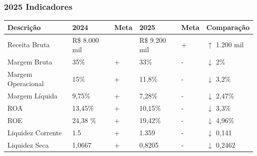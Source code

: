 \subsubsection{2025 Indicadores}
\hspace*{-1cm}                                                                 
 \begin{tabular}{p{3cm} l l l l l}                                                     
 \toprule                                                                       
 \textbf{Descrição} & \textbf{2024} & \textbf{Meta} & \textbf{2025} &  \textbf{Meta} & \textbf{Comparação}  \\                \midrule                                                                       
 Receita Bruta & R\$ 8.000 mil &  &  R\$ 9.200 mil & +  & $\uparrow$ 1.200 mil \\                                        
 \midrule                                                                       
 Margem Bruta & 35\% & + & 33\% & - & $\downarrow$ 2\% \\                                        
 \midrule                                                                       
 Margem Operacional  & 15\% & + & 11,8\% & - &  $\downarrow$ 3,2\% \\                                                 
 \midrule                                                                       
 Margem Líquida & 9,75\% & +  & 7,28\% & -  & $\downarrow$ 2,47\% \\                                                     
  \midrule                                                                       
 ROA & 13,45\% & + & 10,15\% & - & $\downarrow$ 3,3\% \\                                               
 \midrule                                                                       
  ROE & 24,38 \% & + & 19,42\% & - &  $\downarrow$ 4,96\% \\                                        
 \midrule                                                                       
 Liquidez Corrente & 1.5 & + &  1.359 & -  & $\downarrow$ 0,141 \\                                        
 \midrule                                                                       
 Liquidez Seca & 1,0667 & + &   0,8205 & - & $\downarrow$ 0,2462 \\ 
 \bottomrule                                                                    
 \end{tabular}                                                                  
